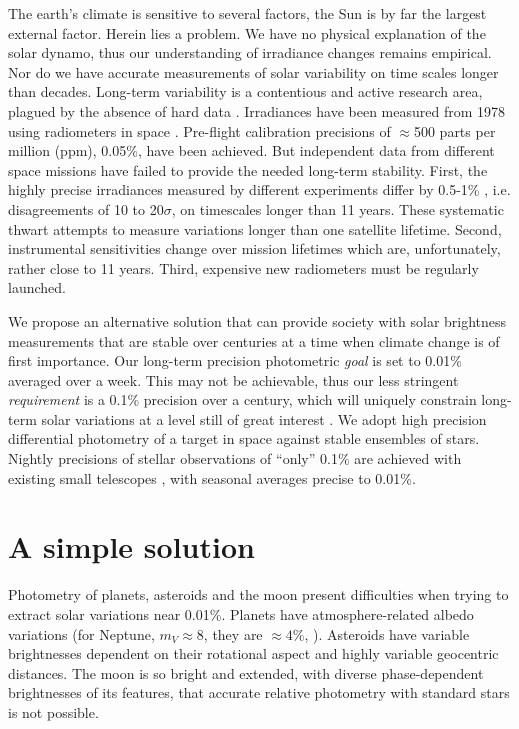 \documentclass[useAMS,usenatbib]{mn2e}
\begin{document}
The earth's climate is sensitive to several factors,
the Sun is by far the largest external factor.  Herein lies a problem.  We 
have no physical explanation of the solar dynamo, thus our
understanding of irradiance changes remains empirical. Nor do we have 
accurate measurements of solar variability on time scales longer than decades.  
Long-term variability is a contentious and active 
research area, plagued by the absence of hard data  
\citep[e.g.][]{Judge+Others2012}. 
Irradiances have been measured from 1978 using radiometers in
space \citep[e.g.][]{Willson2014}.
Pre-flight calibration precisions of
$\approx$500 parts per million (ppm), 0.05\%, have been achieved.  But 
independent data from different space missions have failed to provide 
the needed long-term stability.   
First, the
highly precise irradiances measured by different experiments differ by 0.5-1\%
\citep[see figure 1 of][]{Willson2014}, i.e. disagreements of 10 to 20$\sigma$,
on timescales longer than 11 years.
These systematic thwart
attempts to measure variations longer than one satellite lifetime. 
Second, instrumental sensitivities change
over mission lifetimes which are, unfortunately, 
rather close to 11 years. Third, expensive new radiometers 
must be regularly launched.

We propose an alternative solution that can provide society with solar
brightness measurements that are stable over centuries at a time when
climate change is of first importance.  
Our long-term precision photometric {\em goal}
is set to 0.01\% averaged over a week. This may not be 
achievable, thus 
our less stringent 
{\em requirement} is a 0.1\% precision over a century, which will
uniquely constrain long-term solar variations at a level still 
of great interest
 \citet{Shapiro+others2011,Lubin+others2012}.
We adopt
high precision differential photometry of a target in space
against stable ensembles of stars.   Nightly precisions of stellar observations of
``only'' 0.1\% are achieved with existing small telescopes
\citep{Young+others1991,Henry1999}, with 
seasonal averages precise to 0.01\%.  

\section{A simple solution}

Photometry of planets,
asteroids and the moon present difficulties when trying to
extract solar variations near 0.01\%.  Planets have atmosphere-related
albedo variations (for Neptune, $m_V \approx 8$, they are $\approx
4$\%, \citealp{Lockwood+others1991}).  Asteroids have variable
brightnesses dependent on their rotational aspect and highly variable
geocentric distances.  The moon is so bright and extended, with diverse 
phase-dependent brightnesses of its features, that accurate relative
photometry with standard stars is not possible.
\end{document}
